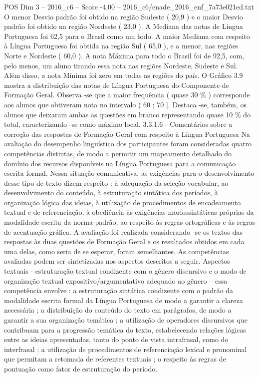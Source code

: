\begin{textsample}{POS Dim 3 – 2016\_c6 – Score -4.00 – 2016\_c6/enade\_2016\_enf\_7a73e021ed.txt}
O menor Desvio padrão foi obtido na região Sudeste ( 20,9 ) e o maior Desvio padrão foi obtido na região Nordeste ( 23,0 ).
A Mediana das notas de Língua Portuguesa foi 62,5 para o Brasil como um todo.
A maior Mediana com respeito à Língua Portuguesa foi obtida na região Sul ( 65,0 ), e a menor, nas regiões Norte e Nordeste ( 60,0 ).
A nota Máxima para todo o Brasil foi de 92,5, com, pelo menos, um aluno tirando essa nota nas regiões Nordeste, Sudeste e Sul.
Além disso, a nota Mínima foi zero em todas as regiões do país.
O Gráfico 3.9 mostra a distribuição das notas de Língua Portuguesa do Componente de Formação Geral.
Observa -se que a maior frequência ( quase 30 \% ) corresponde aos alunos que obtiveram nota no intervalo ( 60 ; 70 ].
Destaca -se, também, os alunos que deixaram ambas as questões em branco representando quase 10 \% do total, caracterizando -se como máximo local. 3.3.1.6 - Comentários sobre a correção das respostas de Formação Geral com respeito à Língua Portuguesa Na avaliação do desempenho linguístico dos participantes foram consideradas quatro competências distintas, de modo a permitir um mapeamento detalhado do domínio dos recursos disponíveis na Língua Portuguesa para a comunicação escrita formal.
Nessa situação comunicativa, as exigências para o desenvolvimento desse tipo de texto dizem respeito : à adequação da seleção vocabular, ao desenvolvimento do conteúdo, à estruturação sintática dos períodos, à organização lógica das ideias, à utilização de procedimentos de encadeamento textual e de referenciação, à obediência às exigências morfossintáticas próprias da modalidade escrita da norma-padrão, ao respeito às regras ortográficas e às regras de acentuação gráfica.
A avaliação foi realizada considerando -se os textos das respostas às duas questões de Formação Geral e os resultados obtidos em cada uma delas, como seria de se esperar, foram semelhantes.
As competências avaliadas podem ser sintetizadas nos aspectos descritos a seguir.
Aspectos textuais - estruturação textual condizente com o gênero discursivo e o modo de organização textual expositivo/argumentativo adequado ao gênero – essa competência envolve : a estruturação sintática condizente com o padrão da modalidade escrita formal da Língua Portuguesa de modo a garantir a clareza necessária ; a distribuição do conteúdo do texto em parágrafos, de modo a garantir a sua organização temática ; a utilização de operadores discursivos que contribuam para a progressão temática do texto, estabelecendo relações lógicas entre as ideias apresentadas, tanto do ponto de vista intrafrasal, como do interfrasal ; a utilização de procedimentos de referenciação lexical e pronominal que permitam a retomada de referentes textuais ; o respeito às regras de pontuação como fator de estruturação do período.

\end{textsample}
